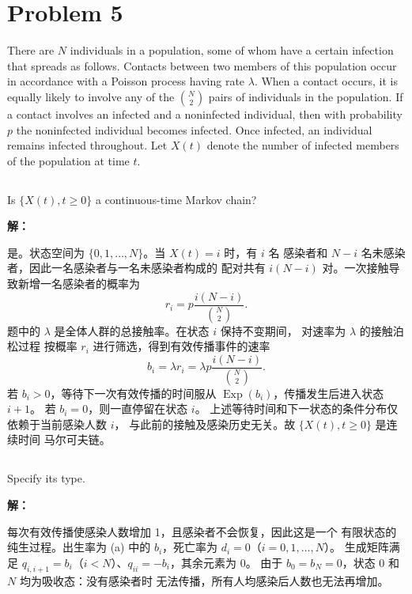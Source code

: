 \documentclass[12pt,a4paper]{article}
\begin{document}
\clearpage
\section{Problem 5}

There are $N$ individuals in a population, some of whom have a certain
infection that spreads as follows. Contacts between two members of this
population occur in accordance with a Poisson process having rate $\lambda$.
When a contact occurs, it is equally likely to involve any of the
$\binom{N}{2}$ pairs of individuals in the population. If a contact involves
an infected and a noninfected individual, then with probability $p$ the
noninfected individual becomes infected. Once infected, an individual
remains infected throughout. Let $X(t)$ denote the number of infected
members of the population at time $t$.

\subsection{}

Is $\{X(t), t \ge 0\}$ a continuous-time Markov chain?

\begin{answerbox}
\textbf{解：}

是。状态空间为 $\{0,1,\ldots,N\}$。当 $X(t)=i$ 时，有 $i$ 名
感染者和 $N-i$ 名未感染者，因此一名感染者与一名未感染者构成的
配对共有 $i(N-i)$ 对。一次接触导致新增一名感染者的概率为
$$
r_i=p\frac{i(N-i)}{\binom{N}{2}}.
$$
题中的 $\lambda$ 是全体人群的总接触率。在状态 $i$ 保持不变期间，
对速率为 $\lambda$ 的接触泊松过程
按概率 $r_i$ 进行筛选，得到有效传播事件的速率
$$
b_i=\lambda r_i=\lambda p\frac{i(N-i)}{\binom{N}{2}}.
$$
若 $b_i>0$，等待下一次有效传播的时间服从
$\operatorname{Exp}(b_i)$，传播发生后进入状态 $i+1$。
若 $b_i=0$，则一直停留在状态 $i$。
上述等待时间和下一状态的条件分布仅依赖于当前感染人数 $i$，
与此前的接触及感染历史无关。故 $\{X(t),t\ge0\}$ 是连续时间
马尔可夫链。
\end{answerbox}

\subsection{}

Specify its type.

\begin{answerbox}
\textbf{解：}

每次有效传播使感染人数增加 1，且感染者不会恢复，因此这是一个
有限状态的纯生过程。出生率为 (a) 中的 $b_i$，死亡率为
$d_i=0$（$i=0,1,\ldots,N$）。
生成矩阵满足 $q_{i,i+1}=b_i$（$i<N$）、$q_{ii}=-b_i$，其余元素为 0。
由于 $b_0=b_N=0$，状态 0 和 $N$ 均为吸收态：没有感染者时
无法传播，所有人均感染后人数也无法再增加。
\end{answerbox}
\end{document}
